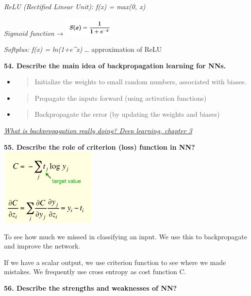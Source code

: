 \textit{ReLU (Rectified Linear Unit):} \emph{f(x) = max(0, x)}

\textit{Sigmoid function} →
\includegraphics[width=0.99219in,height=0.37256in]{media/image11.png}

\textit{Softplus:} \emph{f(x) = ln(1+e\^{}x)} \ldots{} approximation
of ReLU

\textbf{54. Describe the main idea of backpropagation learning for NNs.}

\begin{itemize}
\item
  \begin{quote}
  Initialize the weights to small random numbers, associated with
  biases.
  \end{quote}
\item
  \begin{quote}
  Propagate the inputs forward (using activation functions)
  \end{quote}
\item
  \begin{quote}
  Backpropagate the error (by updating the weights and biases)
  \end{quote}
\end{itemize}

\href{https://www.youtube.com/watch?v=Ilg3gGewQ5U}{\textit{What is
backpropagation really doing? \textbar{} Deep learning, chapter 3}}

\textbf{55. Describe the role of criterion (loss) function in
NN?}\includegraphics[width=1.89421in,height=1.53125in]{media/image32.png}

To see how much we missed in classifying an input. We use this to
backpropagate and improve the network.

If we have a scalar output, we use criterion function to see where we
made mistakes. We frequently use cross entropy as cost function C.

\textbf{56. Describe the strengths and weaknesses of NN?}

